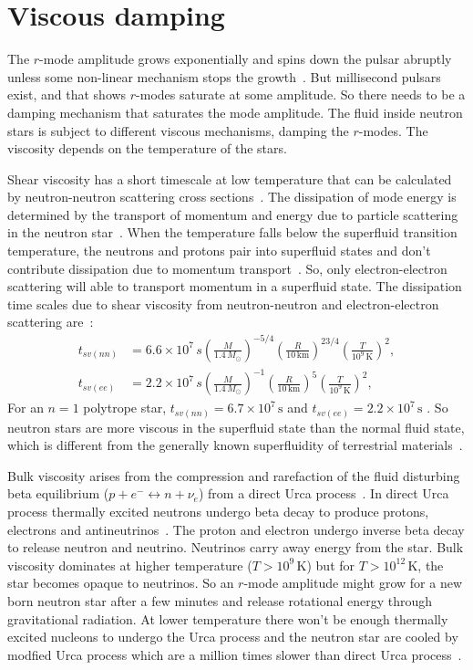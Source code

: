 \documentclass{ttuthes2007}
\begin{document}
\section{Viscous damping}
The $r$-mode amplitude grows exponentially and spins down the pulsar abruptly
unless some non-linear mechanism stops the growth~\cite{PhysRevD.65.084039}. But millisecond
pulsars exist, and that shows $r$-modes saturate at some amplitude. So there
needs to be a damping mechanism that saturates the mode amplitude. The fluid
inside neutron stars is subject to different viscous mechanisms, damping the
$r$-modes. The viscosity depends on the temperature of the stars.

Shear viscosity has a short timescale at low temperature that can be
calculated by neutron-neutron scattering cross sections~\cite{Owen_2000}. The dissipation
of mode energy is determined by the transport of momentum and energy due to
particle scattering in the neutron star~\cite{1987ApJ...314..234C}. When
the temperature falls below the superfluid transition temperature, the neutrons
and protons pair into superfluid states and don't contribute dissipation due to
momentum transport~\cite{1987ApJ...314..234C}. So, only electron-electron
scattering will able to transport momentum in a superfluid state. The
dissipation time scales due to shear viscosity from neutron-neutron and
electron-electron scattering are~\cite{ANDERSSON_2001}:
\begin{align*}
t_{sv(nn)}&=6.6\times10^7
\,s\left(\frac{M}{1.4\,M_\odot}\right)^{-5/4}\left(\frac{R}{10\,\mathrm{km}}\right)^{23/4}\left(\frac{T}{10^9\,\mathrm{K}}\right)^2,\\
t_{sv(ee)}&=2.2\times10^7\,s\left(\frac{M}{1.4\,M_\odot}\right)^{-1}\left(\frac{R}{10\,\mathrm{km}}\right)^5\left(\frac{T}{10^9\,\mathrm{K}}\right)^2,
\end{align*}
For an $n=1$ polytrope star, $t_{sv(nn)}=6.7\times 10^7\,\mathrm{s}$ and
$t_{sv(ee)}=2.2\times 10^7\,\mathrm{s}$ . So neutron stars are more viscous in the superfluid
state than the normal fluid state, which is different from the generally known
superfluidity of terrestrial materials~\cite{1987ApJ...314..234C}.

Bulk viscosity arises from the compression and rarefaction of the fluid
disturbing beta equilibrium ($p+e^- \leftrightarrow n + \nu_e$) from a direct
Urca process~\cite{Owen_2000}. In direct Urca process thermally excited neutrons
undergo beta decay to produce protons, electrons and
antineutrinos~\cite{PhysRevLett.66.2701}.  The proton and electron undergo
inverse beta decay to release neutron and neutrino.  Neutrinos carry away energy
from the star. Bulk viscosity dominates at higher temperature
($T>10^9\,\mathrm{K}$) but for $T > 10^{12} \,\mathrm{K}$, the star becomes
opaque to neutrinos. So an $r$-mode amplitude might grow for a new born neutron
star after a few minutes and release rotational energy through gravitational
radiation. At lower temperature there won't be enough thermally excited nucleons
to undergo the Urca process and the neutron star are cooled by modfied Urca
process which are a million times slower than direct Urca
process~\cite{PhysRevLett.66.2701}.
\end{document}
